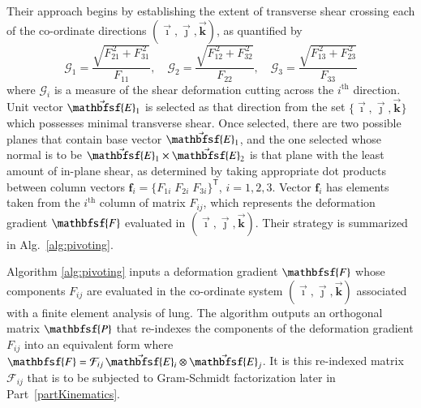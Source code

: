 Their approach begins by establishing the extent of transverse shear crossing each of the co-ordinate directions $( \vec{\boldsymbol{\imath}} , \vec{\boldsymbol{\jmath}} , \vec{\boldsymbol{k}} )$, as quantified by
\begin{equation}
\mathcal{G}_1 =\dfrac{\sqrt{F^{\,2}_{21}+F^{\,2}_{31}}}{F_{11}} , \quad
\mathcal{G}_2 =\dfrac{\sqrt{F^{\,2}_{12}+F^{\,2}_{32}}}{F_{22}} , \quad
\mathcal{G}_3 =\dfrac{\sqrt{F^{\,2}_{13}+F^{\,2}_{23}}}{F_{33}}
\end{equation} 
where $\mathcal{G}_i$ is a measure of the shear deformation cutting across the $i^{\text{th}}$ direction.  Unit vector $\vec{\mathbfsf{E}}_1$ is selected as that direction from the set $\{ \vec{\boldsymbol{\imath}} , \vec{\boldsymbol{\jmath}} , \vec{\boldsymbol{k}} \}$ which possesses minimal transverse shear.  Once selected, there are two possible planes that contain base vector $\vec{\mathbfsf{E}}_1$, and the one selected whose normal is to be $\vec{\mathbfsf{E}}_1 \times \vec{\mathbfsf{E}}_2$ is that plane with the least amount of in-plane shear, as determined by taking appropriate dot products between column vectors $\boldsymbol{f}_i = \{ F_{1i} \; F_{2i} \; F_{3i} \}^{\mathsf{T}}$, $i=1,2,3$.  Vector $\boldsymbol{f}_i$ has elements taken from the $i^{\text{th}}$ column of matrix $F_{ij}$, which represents the deformation gradient $\mathbfsf{F}$ evaluated in $( \vec{\boldsymbol{\imath}} , \vec{\boldsymbol{\jmath}} , \vec{\boldsymbol{k}} )$.  Their strategy is summarized in Alg.~\ref{alg:pivoting}.

Algorithm \ref{alg:pivoting} inputs a deformation gradient $\mathbfsf{F}$ whose components $F_{ij}$ are evaluated in the co-ordinate system $(  \vec{\boldsymbol{\imath}} , \vec{\boldsymbol{\jmath}} , \vec{\boldsymbol{k}} )$ associated with a finite element analysis of lung.  The algorithm outputs an orthogonal matrix $\mathbfsf{P}$ that re-indexes the components of the deformation gradient $F_{ij}$ into an equivalent form where $\mathbfsf{F} = \mathcal{F}_{ij} \, \vec{\mathbfsf{E}}_i \otimes \vec{\mathbfsf{E}}_j$.  It is this re-indexed matrix $\mathcal{F}_{ij}$ that is to be subjected to Gram-Schmidt factorization later in Part~\ref{partKinematics}.  

